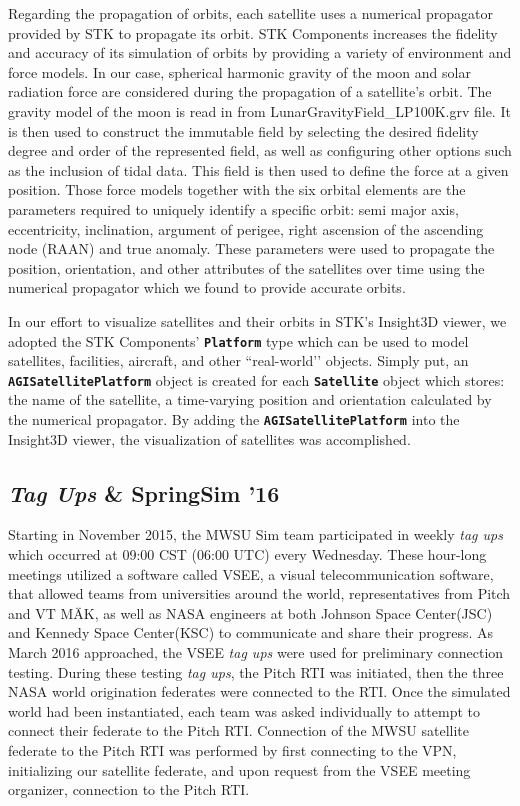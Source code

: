 \documentclass[journal, onecolumn]{IEEEtran}
\newcommand\uml[1]{\texttt{\textbf{#1}}}
\begin{document}
Regarding the propagation of orbits, each satellite uses a numerical propagator provided by STK to propagate its orbit. STK Components increases the fidelity and accuracy of its simulation of orbits by providing a variety of environment and force models. In our case, spherical harmonic gravity of the moon and solar radiation force are considered during the propagation of a satellite\rq{}s orbit. The gravity model of the moon is read in from LunarGravityField\_LP100K.grv file. It is then used to construct the immutable field by selecting the desired fidelity degree and order of the represented field, as well as configuring other options such as the inclusion of tidal data. This field is then used to define the force at a given position. Those force models together with the six orbital elements are the parameters required to uniquely identify a specific orbit: semi major axis, eccentricity, inclination, argument of perigee, right ascension of the ascending node (RAAN) and true anomaly. These parameters were used to propagate the position, orientation, and other attributes of the satellites over time using the numerical propagator which we found to provide accurate orbits. 

In our effort to visualize satellites and their orbits in STK\rq{}s Insight3D viewer, we adopted the STK Components\rq{} \uml{Platform} type which can be used to model satellites, facilities, aircraft, and other ``real-world\rq\rq{} objects. Simply put, an \uml{AGISatellitePlatform} object is created for each \uml{Satellite} object which stores: the name of the satellite, a time-varying position and orientation calculated by the numerical propagator. By adding the \uml{AGISatellitePlatform} into the Insight3D viewer, the visualization of satellites was accomplished.

\subsection{\textit{Tag Ups} \& SpringSim '16}
Starting in November 2015, the MWSU Sim team participated in weekly \textit{tag ups} which occurred at 09:00 CST (06:00 UTC) every Wednesday.  These hour-long meetings utilized a software called VSEE, a visual telecommunication software, that allowed teams from universities around the world, representatives from Pitch and VT M{\"A}K, as well as NASA engineers at both Johnson Space Center(JSC) and Kennedy Space Center(KSC) to communicate and share their progress.  As March 2016 approached, the VSEE \textit{tag ups} were used for preliminary connection testing. During these testing \textit{tag ups}, the Pitch RTI was initiated, then the three NASA world origination federates were connected to the RTI.  Once the simulated world had been instantiated, each team was asked individually to attempt to connect their federate to the Pitch RTI.  Connection of the MWSU satellite federate to the Pitch RTI was performed by first connecting to the VPN, initializing our satellite federate, and upon request from the VSEE meeting organizer, connection to the Pitch RTI.  
\end{document}
